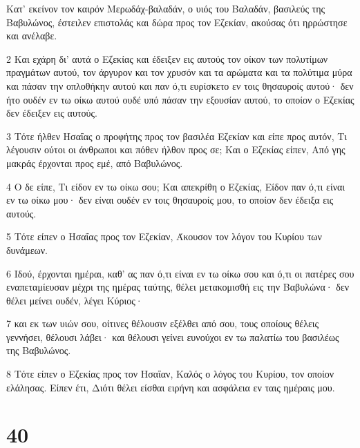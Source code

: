 \par Κατ' εκείνον τον καιρόν Μερωδάχ-βαλαδάν, ο υιός του Βαλαδάν, βασιλεύς της Βαβυλώνος, έστειλεν επιστολάς και δώρα προς τον Εζεκίαν, ακούσας ότι ηρρώστησε και ανέλαβε.
\par 2 Και εχάρη δι' αυτά ο Εζεκίας και έδειξεν εις αυτούς τον οίκον των πολυτίμων πραγμάτων αυτού, τον άργυρον και τον χρυσόν και τα αρώματα και τα πολύτιμα μύρα και πάσαν την οπλοθήκην αυτού και παν ό,τι ευρίσκετο εν τοις θησαυροίς αυτού· δεν ήτο ουδέν εν τω οίκω αυτού ουδέ υπό πάσαν την εξουσίαν αυτού, το οποίον ο Εζεκίας δεν έδειξεν εις αυτούς.
\par 3 Τότε ήλθεν Ησαΐας ο προφήτης προς τον βασιλέα Εζεκίαν και είπε προς αυτόν, Τι λέγουσιν ούτοι οι άνθρωποι και πόθεν ήλθον προς σε; Και ο Εζεκίας είπεν, Από γης μακράς έρχονται προς εμέ, από Βαβυλώνος.
\par 4 Ο δε είπε, Τι είδον εν τω οίκω σου; Και απεκρίθη ο Εζεκίας, Είδον παν ό,τι είναι εν τω οίκω μου· δεν είναι ουδέν εν τοις θησαυροίς μου, το οποίον δεν έδειξα εις αυτούς.
\par 5 Τότε είπεν ο Ησαΐας προς τον Εζεκίαν, Άκουσον τον λόγον του Κυρίου των δυνάμεων.
\par 6 Ιδού, έρχονται ημέραι, καθ' ας παν ό,τι είναι εν τω οίκω σου και ό,τι οι πατέρες σου εναπεταμίευσαν μέχρι της ημέρας ταύτης, θέλει μετακομισθή εις την Βαβυλώνα· δεν θέλει μείνει ουδέν, λέγει Κύριος·
\par 7 και εκ των υιών σου, οίτινες θέλουσιν εξέλθει από σου, τους οποίους θέλεις γεννήσει, θέλουσι λάβει· και θέλουσι γείνει ευνούχοι εν τω παλατίω του βασιλέως της Βαβυλώνος.
\par 8 Τότε είπεν ο Εζεκίας προς τον Ησαΐαν, Καλός ο λόγος του Κυρίου, τον οποίον ελάλησας. Είπεν έτι, Διότι θέλει είσθαι ειρήνη και ασφάλεια εν ταις ημέραις μου.

\chapter{40}

